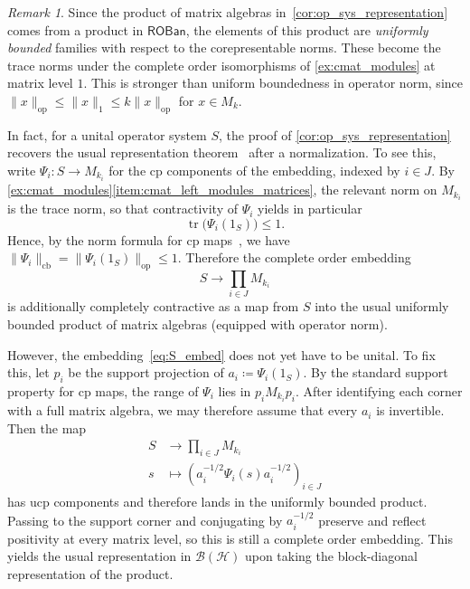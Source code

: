 \documentclass[11pt,onecolumn]{article}
\newcommand{\ROBan}{\mathsf{ROBan}}
\theoremstyle{plain}
\theoremstyle{remark}
\newtheorem{remark}[remark]{Remark}
\theoremstyle{definition}
\begin{document}
\begin{remark}
	\label{rem:op_sys_representation}
	Since the product of matrix algebras in~\cref{cor:op_sys_representation} comes from a product in $\ROBan$,
	the elements of this product are \emph{uniformly bounded} families with respect to the corepresentable norms.
	These become the trace norms under the complete order isomorphisms of \cref{ex:cmat_modules} at matrix level $1$.
	This is stronger than uniform boundedness in operator norm, since
	$\|x\|_{\mathrm{op}} \le \|x\|_1 \le k\|x\|_{\mathrm{op}}$ for $x\in M_k$.

	In fact, for a unital operator system $S$,
	the proof of \cref{cor:op_sys_representation} recovers the usual representation theorem~\cite[Theorem~13.1]{Paulsen} after a normalization.
	To see this, write $\Psi_i \colon S \to M_{k_i}$ for the cp components of the embedding, indexed by $i \in J$.
	By \cref{ex:cmat_modules}\ref{item:cmat_left_modules_matrices}, the relevant norm on $M_{k_i}$ is the trace norm,
	so that contractivity of $\Psi_i$ yields in particular
	\[
		\operatorname{tr}\bigl(\Psi_i(1_S)\bigr) \le 1.
	\]
	Hence, by the norm formula for cp maps~\cite[Proposition~3.6]{Paulsen}, we have $\|\Psi_i\|_{\mathrm{cb}}=\|\Psi_i(1_S)\|_{\mathrm{op}}\le 1$.
	Therefore the complete order embedding 
	\begin{equation}
		\label{eq:S_embed}
		S \longrightarrow \prod_{i \in J} M_{k_i}
	\end{equation}
	is additionally completely contractive as a map from $S$ into the usual uniformly bounded product of matrix algebras (equipped with operator norm).

	However, the embedding~\eqref{eq:S_embed} does not yet have to be unital.
	To fix this, let $p_i$ be the support projection of $a_i\coloneqq\Psi_i(1_S)$.
	By the standard support property for cp maps, the range of $\Psi_i$ lies in $p_iM_{k_i}p_i$.
	After identifying each corner with a full matrix algebra, we may therefore assume that every $a_i$ is invertible.
	Then the map
	\begin{align*}
		S & \longrightarrow \prod_{i \in J} M_{k_i} \\
		s & \longmapsto (a_i^{-1/2}\Psi_i(s)a_i^{-1/2})_{i \in J}
	\end{align*}
	has ucp components and therefore lands in the uniformly bounded product.
	Passing to the support corner and conjugating by $a_i^{-1/2}$ preserve and reflect positivity at every matrix level, so this is still a complete order embedding.
	This yields the usual representation in $\mathcal{B}(\mathcal{H})$ upon taking the block-diagonal representation of the product.
\end{remark}
\end{document}
